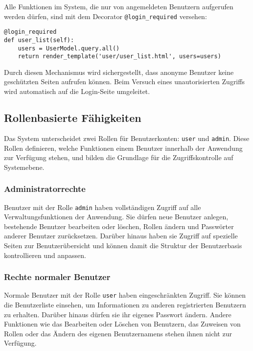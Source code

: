 \documentclass[12pt]{article}
\begin{document}
Alle Funktionen im System, die nur von angemeldeten Benutzern aufgerufen werden dürfen, sind mit dem Decorator \texttt{@login\_required} versehen:

\noindent
\begin{verbatim}
@login_required
def user_list(self):
    users = UserModel.query.all()
    return render_template('user/user_list.html', users=users)
\end{verbatim}

\noindent Durch diesen Mechanismus wird sichergestellt, dass anonyme Benutzer keine geschützten Seiten aufrufen können. Beim Versuch eines unautorisierten Zugriffs wird automatisch auf die Login-Seite umgeleitet.

\subsection{Rollenbasierte Fähigkeiten}

Das System unterscheidet zwei Rollen für Benutzerkonten: \texttt{user} und \texttt{admin}. Diese Rollen definieren, welche Funktionen einem Benutzer innerhalb der Anwendung zur Verfügung stehen, und bilden die Grundlage für die Zugriffskontrolle auf Systemebene.

\subsubsection*{Administratorrechte}

Benutzer mit der Rolle \texttt{admin} haben vollständigen Zugriff auf alle Verwaltungsfunktionen der Anwendung. Sie dürfen neue Benutzer anlegen, bestehende Benutzer bearbeiten oder löschen, Rollen ändern und Passwörter anderer Benutzer zurücksetzen. Darüber hinaus haben sie Zugriff auf spezielle Seiten zur Benutzerübersicht und können damit die Struktur der Benutzerbasis kontrollieren und anpassen.

\subsubsection*{Rechte normaler Benutzer}

Normale Benutzer mit der Rolle \texttt{user} haben eingeschränkten Zugriff. Sie können die Benutzerliste einsehen, um Informationen zu anderen registrierten Benutzern zu erhalten. Darüber hinaus dürfen sie ihr eigenes Passwort ändern. Andere Funktionen wie das Bearbeiten oder Löschen von Benutzern, das Zuweisen von Rollen oder das Ändern des eigenen Benutzernamens stehen ihnen nicht zur Verfügung.
\end{document}
